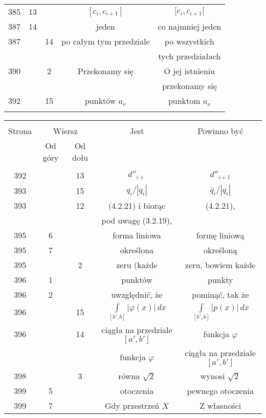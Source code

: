 \documentclass[a4paper]{article}
\begin{document}
\begin{center}
\begin{tabular}{|c|c|c|c|c|}
    385 & 13 & & $[ c_{ i }, c_{ i + 1} ]$ & $[ c_{ i }, c_{ i + 1} [$ \\
    387 & 14 & & jeden & co najmniej jeden \\
    387 & & 14 & po całym tym przedziale & po wszystkich \\
    & & & & tych przedziałach \\
    390 & & 2 & Przekonamy się & O jej istnieniu \\
    & & & & przekonamy się \\
    392 & & 15 & punktów $a_{ \nu }$ & punktom $a_{ \nu }$ \\
    & & & & \\ \hline
  \end{tabular}

  \begin{tabular}{|c|c|c|c|c|}
    \hline
    & \multicolumn{2}{c|}{} & & \\
    Strona & \multicolumn{2}{c|}{Wiersz}& Jest & Powinno być \\ \cline{2-3}
    & Od góry & Od dołu &  &  \\ \hline
    & & & & \\
    392 & & 13 & $d''_{ i + }$ & $d''_{ i + 1 }$ \\
    393 & & 15 & $q_{ i }/| q_{ i } |$ & $\bar{ q }_{ i }/| q_{ i } |$ \\
    393 & & 12 & (4.2.21) i biorąc & (4.2.21), \\
    & & & pod uwagę (3.2.19), & \\
    395 & 6 & & forma liniowa & formę liniową \\
    395 & 7 & & określona & określoną \\
    395 & & 2 & zeru (każde & zeru, bowiem każde \\
    396 & 1 & & punktów & punkty \\
    396 & 2 & & uwzględnić, że & pominąć, tak że \\
    396 & & 15 & $\int\limits_{ [ b', b ] } | \varphi( x ) | \, dx$
           & $\int\limits_{ [ b', b ] } | p( x ) | \, dx$ \\
    396 & & 14 & ciągła na przedziale $[ a', b' ]$ & funkcja $\varphi$ \\
    & & & funkcja $\varphi$ & ciągła na przedziale $[ a', b' ]$ \\
    398 & & 3 & równa $\sqrt{ 2 }$ & wynosi $\sqrt{ 2 }$ \\
    399 & 5 & & otoczenia & pewnego otoczenia \\
    399 & 7 & & Gdy przestrzeń $X$ & Z własności \\

\end{tabular}
\end{center}
\end{document}
